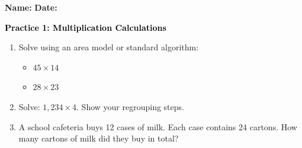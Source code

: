 \documentclass[12pt, letterpaper, fleqn]{article}
\begin{document}
\textbf{Name:} \underline{\hspace{5cm}}
\hfill
\textbf{Date:} \underline{\hspace{3cm}}\\

\begin{tcolorbox}[colback=customteal!20]
    \large\textcolor{black}{\textbf{Practice 1: Multiplication Calculations}}
\end{tcolorbox}

\vspace{5mm}
\begin{enumerate}[itemsep=3cm, leftmargin=0.6cm]
\item Solve using an area model or standard algorithm:
  \begin{itemize}[itemsep=1cm]
    \item $45 \times 14$
    \vspace{3cm}
    \item $28 \times 23$
    \vspace{3cm}
  \end{itemize}

\item Solve: $1,234 \times 4$. Show your regrouping steps.
\vspace{3cm}

\item A school cafeteria buys 12 cases of milk. Each case contains 24 cartons. How many cartons of milk did they buy in total?
\end{enumerate}
\end{document}
